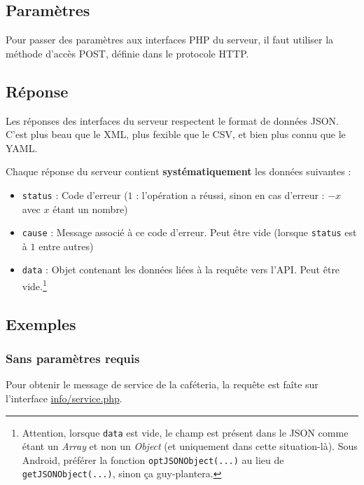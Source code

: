 \documentclass[12pt,a4paper,oneside]{report}
\begin{document}
\subsection{Paramètres}

Pour passer des paramètres aux interfaces PHP du serveur, il faut utiliser la méthode d'accès POST, définie dans le protocole HTTP.

\subsection{Réponse}

Les réponses des interfaces du serveur respectent le format de données JSON. C'est plus beau que le XML, plus fexible que le CSV, et bien plus connu que le YAML.

\noindent Chaque réponse du serveur contient \textbf{systématiquement} les données suivantes :

\begin{itemize}

\item \texttt{status} : Code d'erreur ($1$ : l'opération a réussi, sinon en cas d'erreur : $-x$ avec $x$ étant un nombre)

\item \texttt{cause} : Message associé à ce code d'erreur. Peut être vide (lorsque \texttt{status} est à $1$ entre autres)

\item \texttt{data} : Objet contenant les données liées à la requête vers l'API. Peut être vide.\footnote{Attention, lorsque \texttt{data} est vide, le champ est présent dans le JSON comme étant un \textit{Array} et non un \textit{Object} (et uniquement dans cette situation-là). Sous Android, préférer la fonction \texttt{optJSONObject(...)} au lieu de \texttt{getJSONObject(...)}, sinon ça guy-plantera.}

\end{itemize}

\subsection{Exemples}

\subsubsection{Sans paramètres requis}

Pour obtenir le message de service de la caféteria, la requête est faîte sur l'interface \url{info/service.php}.\\
\end{document}
